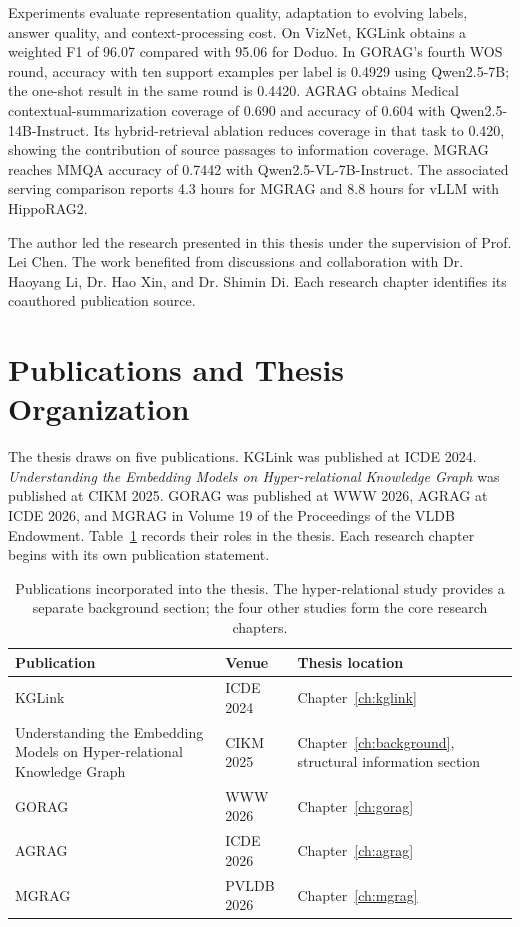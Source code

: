Experiments evaluate representation quality, adaptation to evolving labels, answer quality, and context-processing cost. On VizNet, KGLink obtains a weighted F1 of 96.07 compared with 95.06 for Doduo. In GORAG's fourth WOS round, accuracy with ten support examples per label is 0.4929 using Qwen2.5-7B; the one-shot result in the same round is 0.4420. AGRAG obtains Medical contextual-summarization coverage of 0.690 and accuracy of 0.604 with Qwen2.5-14B-Instruct. Its hybrid-retrieval ablation reduces coverage in that task to 0.420, showing the contribution of source passages to information coverage. MGRAG reaches MMQA accuracy of 0.7442 with Qwen2.5-VL-7B-Instruct. The associated serving comparison reports 4.3 hours for MGRAG and 8.8 hours for vLLM with HippoRAG2.

The author led the research presented in this thesis under the supervision of Prof. Lei Chen. The work benefited from discussions and collaboration with Dr. Haoyang Li, Dr. Hao Xin, and Dr. Shimin Di. Each research chapter identifies its coauthored publication source.

\section{Publications and Thesis Organization}
\label{sec:introduction:organization}
The thesis draws on five publications. KGLink was published at ICDE 2024. \emph{Understanding the Embedding Models on Hyper-relational Knowledge Graph} was published at CIKM 2025. GORAG was published at WWW 2026, AGRAG at ICDE 2026, and MGRAG in Volume 19 of the Proceedings of the VLDB Endowment. Table~\ref{tab:introduction:publications} records their roles in the thesis. Each research chapter begins with its own publication statement.

\begin{table}[tbp]
\centering\small
\caption{Publications incorporated into the thesis. The hyper-relational study provides a separate background section; the four other studies form the core research chapters.}
\label{tab:introduction:publications}
\begin{tabular}{p{}p{}p{}}
\toprule
Publication & Venue & Thesis location\\
\midrule
KGLink~\cite{kglink-publication} & ICDE 2024 & Chapter~\ref{ch:kglink}\\
Understanding the Embedding Models on Hyper-relational Knowledge Graph~\cite{bg-hyperkg} & CIKM 2025 & Chapter~\ref{ch:background}, structural information section\\
GORAG~\cite{gorag-paper} & WWW 2026 & Chapter~\ref{ch:gorag}\\
AGRAG~\cite{agrag-paper} & ICDE 2026 & Chapter~\ref{ch:agrag}\\
MGRAG~\cite{mgrag-paper} & PVLDB 2026 & Chapter~\ref{ch:mgrag}\\
\bottomrule
\end{tabular}
\end{table}

